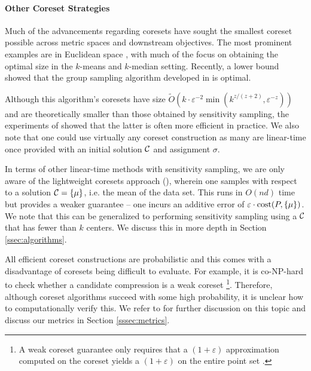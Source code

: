 

\paragraph*{Other Coreset Strategies}
\label{ssec:clustering_prelim}

Much of the advancements regarding coresets have sought the smallest coreset possible across metric spaces and downstream objectives. The most prominent
examples are in Euclidean space \cite{BadoiuHI02, HaM04, Chen09, HuangV20, stoc22}, with much of the focus on obtaining the optimal size in the $k$-means and
$k$-median setting. Recently, a lower bound \cite{huangLB} showed that the group sampling algorithm developed in \cite{stoc21, stoc22} is optimal.

Although this algorithm's coresets have size $\tilde{O}(k\cdot \varepsilon^{-2} \min(k^{z/(z+2)},\varepsilon^{-z}))$ \cite{CLSSS22} and are theoretically smaller than
those obtained by sensitivity sampling, the experiments of \cite{chrisESA} showed that the latter is often more efficient in practice. We also note that one
could use virtually any coreset construction as many are linear-time once provided with an initial solution $\mathcal C$ and assignment $\sigma$.

In terms of other linear-time methods with sensitivity sampling, we are only aware of the lightweight coresets approach (\cite{BachemL018}), wherein one
samples with respect to a solution $\mathcal C=\{\mu\}$, i.e. the mean of the data set. This runs in $O(nd)$ time but provides a weaker guarantee -- one incurs an
additive error of $\varepsilon\cdot \operatorname{cost}(P,\{\mu\})$.  We note that this can be generalized to performing sensitivity sampling using a $\mathcal C$ that has fewer
than $k$ centers. We discuss this in more depth in Section \ref{ssec:algorithms}.

All efficient coreset constructions are probabilistic and this comes with a disadvantage of coresets being difficult to evaluate. For example, it is co-NP-hard to
check whether a candidate compression is a weak coreset \footnote{A weak coreset guarantee only requires that a $(1+\varepsilon)$ approximation
computed on the coreset yields a $(1+\varepsilon)$ on the entire point set \cite{chrisESA}.}. Therefore, although coreset algorithms succeed with some high probability, it is
unclear how to computationally verify this. We refer to \cite{chrisESA} for further discussion on this topic and discuss our metrics in Section \ref{sssec:metrics}.

